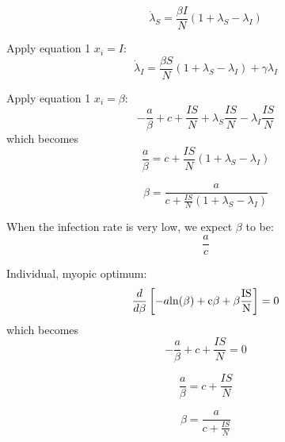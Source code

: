 \documentclass[11pt]{article} %
\begin{document}
\begin{equation}
\dot{\lambda}_S = \frac{\beta I}{N}(1 + \lambda_S-\lambda_I)
\end{equation}

Apply equation 1 $x_i = I$:
\begin{equation}
\dot{\lambda}_I = \frac{\beta S}{N}(1+\lambda_S-\lambda_I)+\gamma \lambda_I
\end{equation}

Apply equation 1 $x_i = \beta$:
\begin{equation}
-\frac{a}{\beta}+c+\frac{IS}{N}+\lambda_S \frac{IS}{N}-\lambda_I \frac{IS}{N}
\end{equation}
which becomes
\begin{equation}
\frac{a}{\beta} = c + \frac{IS}{N}(1+\lambda_S-\lambda_I)
\end{equation}

\begin{equation}
\beta = \frac{a}{c+\frac{IS}{N}(1+\lambda_S-\lambda_I)}
\end{equation}


When the infection rate is very low, we expect $\beta$ to be:
\begin{equation}
\frac{a}{c}
\end{equation}



Individual, myopic optimum: 
\begin{equation}
\frac{d}{d \beta}\left[-a\rm{ln}({\beta})+c\beta+\beta\frac{ IS}{N}\right] = 0
\end{equation}
which becomes 
\begin{equation}
-\frac{a}{\beta}+c+\frac{IS}{N} = 0
\end{equation}

\begin{equation}
\frac{a}{\beta} = c+\frac{IS}{N}
\end{equation}

\begin{equation}
\beta = \frac{a}{c+\frac{IS}{N}}
\end{equation}
\end{document}
